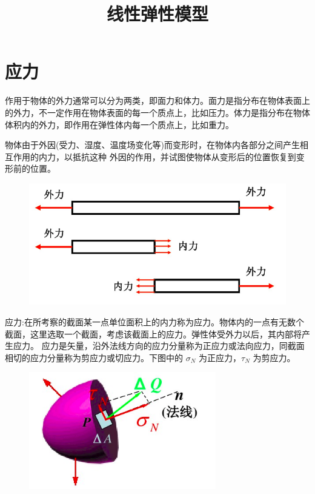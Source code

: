 \documentclass[12pt,a4paper]{article}
\title{线性弹性模型}
\date{\chntoday}
\begin{document}
\maketitle

\section{应力}

作用于物体的外力通常可以分为两类，即面力和体力。面力是指分布在物体表面上的外力，不一定作用在物体表面的每一个质点上，比如压力。体力是指分布在物体体积内的外力，即作用在弹性体内每一个质点上，比如重力。

物体由于外因(受力、湿度、温度场变化等)而变形时，在物体内各部分之间产生相互作用的内力，以抵抗这种
外因的作用，并试图使物体从变形后的位置恢复到变形前的位置。

\begin{figure}[H]
\centering
\includegraphics[scale=0.4]{./figures/1.png}
\caption{}
\end{figure}

应力:在所考察的截面某一点单位面积上的内力称为应力。物体内的一点有无数个截面，这里选取一个截面，考虑该截面上的应力。弹性体受外力以后，其内部将产生应力。
应力是矢量，沿外法线方向的应力分量称为正应力或法向应力，同截面相切的应力分量称为剪应力或切应力。下图中的 $\sigma _N$ 为正应力，$\tau _N$ 为剪应力。

\begin{figure}[H]
\centering
\includegraphics[scale=0.5]{./figures/2.png}
\caption{}
\end{figure}
\end{document}
